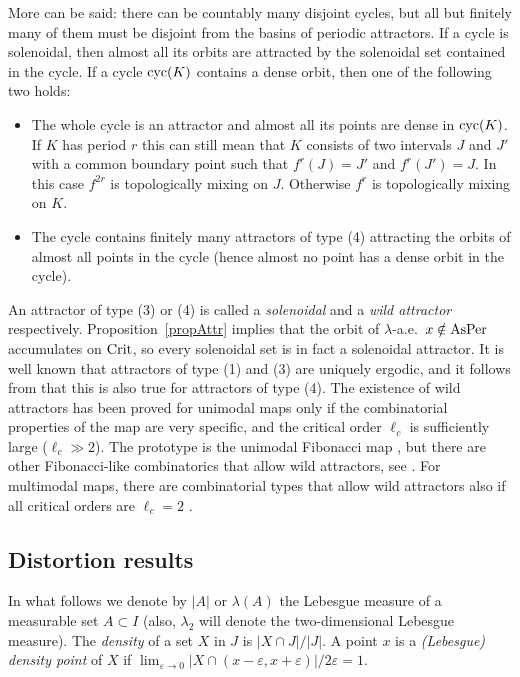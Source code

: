 \documentclass[12pt, psamsfonts, reqno]{amsart}
\begin{document}
More can be said: there can be countably many disjoint cycles, but
all but finitely many of them must be disjoint from the basins of
periodic attractors. If a cycle  is solenoidal, then almost all
its orbits are attracted by the solenoidal set contained in the
cycle. If a cycle ${\mathop{\rm cyc}\nolimits}(K)$ contains a dense orbit, then one of
the following two holds:
\begin{itemize}
 \item The whole cycle is an attractor and almost all its points
are dense in ${\mathop{\rm cyc}\nolimits}(K)$. If $K$ has period $r$  this can still mean
that $K$ consists of two intervals $J$ and $J'$ with a common
boundary point such that $f^r(J) = J'$ and $f^r(J') = J$. In this
case $f^{2r}$ is topologically mixing on $J$. Otherwise $f^r$ is
topologically mixing on $K$.
 \item The cycle contains finitely
many attractors of type (4) attracting the orbits of almost all
points in the cycle (hence almost no point has a dense orbit in
the cycle).
\end{itemize}
An attractor of type (3) or (4) is called a \emph{solenoidal} and
a {\em wild attractor} respectively. Proposition~\ref{propAttr}
implies that the orbit of $\lambda$-a.e.\ $x\notin {\mathop{\rm AsPer}\nolimits}$
accumulates on ${\mathop{\rm Crit}\nolimits}$, so every solenoidal set is in fact a
solenoidal attractor. It is well known that attractors of type (1)
and (3) are uniquely ergodic, and it follows from \cite[Theorem
4]{BSS} that this is also true for attractors of type (4). The
existence of wild attractors has been proved for unimodal maps
only if the combinatorial properties of the map are very specific,
and the critical order $\ell_c$ is sufficiently large ($\ell_c \gg
2$). The prototype is the unimodal Fibonacci map \cite{BKNS}, but
there are other Fibonacci-like combinatorics that allow wild
attractors, see \cite{BTams}. For multimodal maps, there are
combinatorial types that allow wild attractors also if all
critical orders are $\ell_c = 2$ \cite{vS}.

\subsection{Distortion results}\label{subsec:distortion}
In what follows we denote by $|A|$ or $\lambda(A)$ the Lebesgue
measure of a measurable set $A\subset I$ (also, $\lambda_2$ will
denote the two-dimensional Lebesgue measure).  The
\emph{density} of a set $X$ in $J$ is $|X\cap J|/|J|$.
A point $x$ is a \emph{(Lebesgue) density point} of $X$ if
$\lim_{{\varepsilon} \to 0} |X \cap (x-{\varepsilon}, x+{\varepsilon})|/2{\varepsilon} = 1$.
\end{document}
